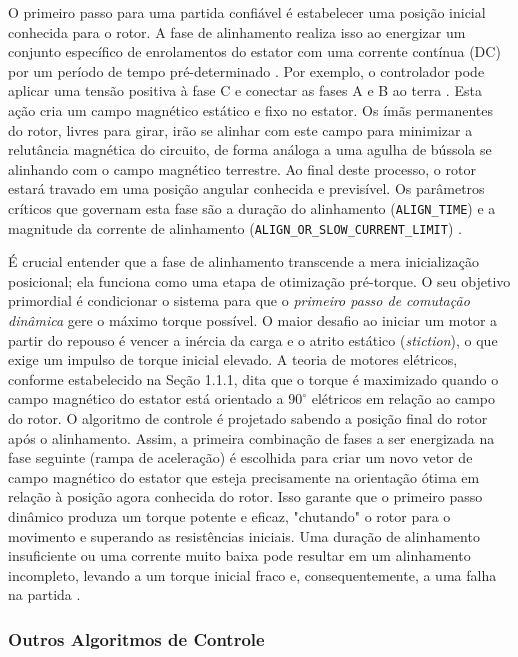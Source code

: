 \documentclass[12pt, a4paper, openright, oneside, brazilian]{abntex2}
\begin{document}
O primeiro passo para uma partida confiável é estabelecer uma posição inicial conhecida para o rotor. A fase de alinhamento realiza isso ao energizar um conjunto específico de enrolamentos do estator com uma corrente contínua (DC) por um período de tempo pré-determinado \cite{ti2022minimizing, nxp2023sensorless}. Por exemplo, o controlador pode aplicar uma tensão positiva à fase C e conectar as fases A e B ao terra \cite{ti2022minimizing}. Esta ação cria um campo magnético estático e fixo no estator. Os ímãs permanentes do rotor, livres para girar, irão se alinhar com este campo para minimizar a relutância magnética do circuito, de forma análoga a uma agulha de bússola se alinhando com o campo magnético terrestre. Ao final deste processo, o rotor estará travado em uma posição angular conhecida e previsível. Os parâmetros críticos que governam esta fase são a duração do alinhamento (\texttt{ALIGN\_TIME}) e a magnitude da corrente de alinhamento (\texttt{ALIGN\_OR\_SLOW\_CURRENT\_LIMIT}) \cite{ti2022minimizing}.

É crucial entender que a fase de alinhamento transcende a mera inicialização posicional; ela funciona como uma etapa de otimização pré-torque. O seu objetivo primordial é condicionar o sistema para que o \textit{primeiro passo de comutação dinâmica} gere o máximo torque possível. O maior desafio ao iniciar um motor a partir do repouso é vencer a inércia da carga e o atrito estático (\textit{stiction}), o que exige um impulso de torque inicial elevado. A teoria de motores elétricos, conforme estabelecido na Seção 1.1.1, dita que o torque é maximizado quando o campo magnético do estator está orientado a $90^{\circ}$ elétricos em relação ao campo do rotor. O algoritmo de controle é projetado sabendo a posição final do rotor após o alinhamento. Assim, a primeira combinação de fases a ser energizada na fase seguinte (rampa de aceleração) é escolhida para criar um novo vetor de campo magnético do estator que esteja precisamente na orientação ótima em relação à posição agora conhecida do rotor. Isso garante que o primeiro passo dinâmico produza um torque potente e eficaz, "chutando" o rotor para o movimento e superando as resistências iniciais. Uma duração de alinhamento insuficiente ou uma corrente muito baixa pode resultar em um alinhamento incompleto, levando a um torque inicial fraco e, consequentemente, a uma falha na partida \cite{ti2022minimizing, jones2025failures}.

 \subsubsection{Outros Algoritmos de Controle} 
\end{document}
